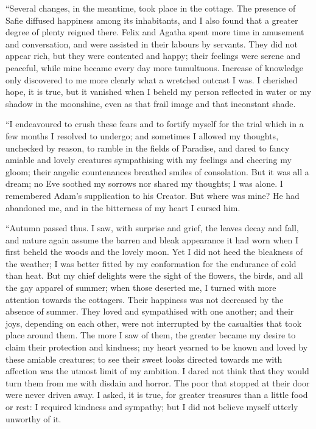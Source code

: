 \documentclass[12pt,openright]{book}
\begin{document}
“Several changes, in the meantime, took place in the cottage. The presence of Safie diffused happiness among its inhabitants, and I also found that a greater degree of plenty reigned there. Felix and Agatha spent more time in amusement and conversation, and were assisted in their labours by servants. They did not appear rich, but they were contented and happy; their feelings were serene and peaceful, while mine became every day more tumultuous. Increase of knowledge only discovered to me more clearly what a wretched outcast I was. I cherished hope, it is true, but it vanished when I beheld my person reflected in water or my shadow in the moonshine, even as that frail image and that inconstant shade.

“I endeavoured to crush these fears and to fortify myself for the trial which in a few months I resolved to undergo; and sometimes I allowed my thoughts, unchecked by reason, to ramble in the fields of Paradise, and dared to fancy amiable and lovely creatures sympathising with my feelings and cheering my gloom; their angelic countenances breathed smiles of consolation. But it was all a dream; no Eve soothed my sorrows nor shared my thoughts; I was alone. I remembered Adam’s supplication to his Creator. But where was mine? He had abandoned me, and in the bitterness of my heart I cursed him.

“Autumn passed thus. I saw, with surprise and grief, the leaves decay and fall, and nature again assume the barren and bleak appearance it had worn when I first beheld the woods and the lovely moon. Yet I did not heed the bleakness of the weather; I was better fitted by my conformation for the endurance of cold than heat. But my chief delights were the sight of the flowers, the birds, and all the gay apparel of summer; when those deserted me, I turned with more attention towards the cottagers. Their happiness was not decreased by the absence of summer. They loved and sympathised with one another; and their joys, depending on each other, were not interrupted by the casualties that took place around them. The more I saw of them, the greater became my desire to claim their protection and kindness; my heart yearned to be known and loved by these amiable creatures; to see their sweet looks directed towards me with affection was the utmost limit of my ambition. I dared not think that they would turn them from me with disdain and horror. The poor that stopped at their door were never driven away. I asked, it is true, for greater treasures than a little food or rest: I required kindness and sympathy; but I did not believe myself utterly unworthy of it.
\end{document}
